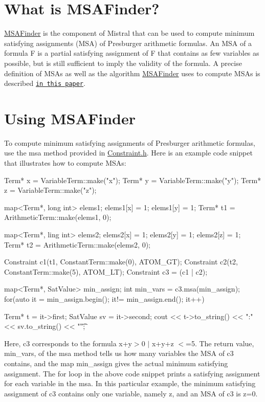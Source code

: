 \hypertarget{msa_msa-intro}{}\section{\-What is M\-S\-A\-Finder?}\label{msa_msa-intro}
\hyperlink{classMSAFinder}{\-M\-S\-A\-Finder} is the component of \-Mistral that can be used to compute minimum satisfying assignments (\-M\-S\-A) of \-Presburger arithmetic formulas. \-An \-M\-S\-A of a formula \-F is a partial satisfying assignment of \-F that contains as few variables as possible, but is still sufficient to imply the validity of the formula. \-A precise definition of \-M\-S\-As as well as the algorithm \hyperlink{classMSAFinder}{\-M\-S\-A\-Finder} uses to compute \-M\-S\-As is described \href{http://www.cs.wm.edu/~idillig/cav2012.pdf}{\tt in this paper}.\hypertarget{msa_use-msa}{}\section{\-Using M\-S\-A\-Finder}\label{msa_use-msa}
\-To compute minimum satisfying assignments of \-Presburger arithmetic formulas, use the msa method provided in \hyperlink{Constraint_8h_source}{\-Constraint.\-h}. \-Here is an example code snippet that illustrates how to compute \-M\-S\-As\-:

\begin{DoxyVerb}
Term* x = VariableTerm::make("x");
Term* y = VariableTerm::make("y");
Term* z = VariableTerm::make("z");

map<Term*, long int> elems1;
elems1[x] = 1;
elems1[y] = 1;
Term* t1 = ArithmeticTerm::make(elems1, 0);

map<Term*, ling int> elems2;
elems2[x] = 1;
elems2[y] = 1;
elems2[z] = 1;
Term* t2 = ArithmeticTerm::make(elems2, 0);

Constraint c1(t1, ConstantTerm::make(0), ATOM_GT);
Constraint c2(t2, ConstantTerm::make(5), ATOM_LT);
Constraint c3 = (c1 | c2);

map<Term*, SatValue> min_assign;
int min_vars = c3.msa(min_assign);
for(auto it = min_assign.begin(); it!= min_assign.end(); it++) {
	Term* t = it->first;
	SatValue sv = it->second;
	cout << t->to_string() << ":" << sv.to_string() << "\t";

}
\end{DoxyVerb}


\-Here, c3 corresponds to the formula x+y$>$0 $|$ x+y+z $<$=5. \-The return value, min\-\_\-vars, of the msa method tells us how many variables the \-M\-S\-A of c3 contains, and the map min\-\_\-assign gives the actual minimum satisfying assignment. \-The for loop in the above code snippet prints a satisfying assignment for each variable in the msa. \-In this particular example, the minimum satisfying assignment of c3 contains only one variable, namely z, and an \-M\-S\-A of c3 is z=0.

